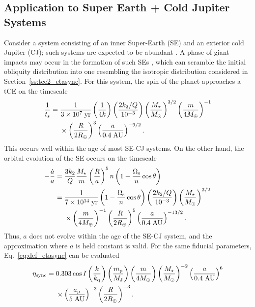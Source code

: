 \documentclass[
        fleqn,
        usenatbib,
    ]{mnras}
\newcommand*{\p}[1]{\left(#1\right)}
\begin{document}
\subsection{Application to Super Earth + Cold Jupiter Systems
}\label{ss:disc_sehj}

Consider a system consisting of an inner Super-Earth (SE) and an exterior cold
Jupiter (CJ); such systems are expected to be abundant \citep{zhu2018super}. A
phase of giant impacts may occur in the formation of such SEs
\citep{inamdar2015formation, izidoro2017breaking}, which can scramble the
initial obliquity distribution into one resembling the isotropic distribution
considered in Section~\ref{ss:tce2_etasync}. For this system, the spin of the
planet approaches a tCE on the timescale
\begin{align}
    \frac{1}{t_{\rm s}} ={}& \frac{1}{3 \times 10^7\;\mathrm{yr}}
            \p{\frac{1}{4k}}
            \p{\frac{2k_2/Q}{10^{-3}}}
            \p{\frac{M_\star}{M_{\odot}}}^{3/2}
            \p{\frac{m}{4M_{\oplus}}}^{-1}\nonumber\\
        &\times \p{\frac{R}{2R_{\oplus}}}^3
            \p{\frac{a}{0.4\;\mathrm{AU}}}^{-9/2}.
\end{align}
This occurs well within the age of most SE-CJ systems. On the other hand,
the orbital evolution of the SE occurs on the timescale \citep{lai2012}
\begin{align}
    -\frac{\dot{a}}{a} ={}& \frac{3k_2}{Q}\frac{M_\star}{m}
            \p{\frac{R}{a}}^5n \p{1 - \frac{\Omega_{\rm s}}{n}\cos \theta}\nonumber\\
        ={}& \frac{1}{7 \times 10^{14}\;\mathrm{yr}}
            \p{1 - \frac{\Omega_{\rm s}}{n}\cos \theta}
            \p{\frac{2k_2/Q}{10^{-3}}}
            \p{\frac{M_\star}{M_{\odot}}}^{3/2}\nonumber\\
        &\times \p{\frac{m}{4M_{\oplus}}}^{-1}
            \p{\frac{R}{2R_{\oplus}}}^5
            \p{\frac{a}{0.4\;\mathrm{AU}}}^{-13/2}.
\end{align}
Thus, $a$ does not evolve within the age of the SE-CJ system, and the
approximation where $a$ is held constant is valid. For the same fiducial
parameters, Eq.~\eqref{eq:def_etasync} can be evaluated
\begin{align}
    \eta_{\rm sync} ={}& 0.303 \cos I
            \p{\frac{k}{k_{\rm q}}}
            \p{\frac{m_{\rm p}}{M_{\rm J}}}
            \p{\frac{m}{4M_{\oplus}}}
            \p{\frac{M_\star}{M_{\odot}}}^{-2}
            \p{\frac{a}{0.4\;\mathrm{AU}}}^{6}\nonumber\\
        &\times \p{\frac{a_{\rm p}}{5\;\mathrm{AU}}}^{-3}
            \p{\frac{R}{2R_{\oplus}}}^{-3}.\label{eq:sehj_etasync}
\end{align}
\end{document}
